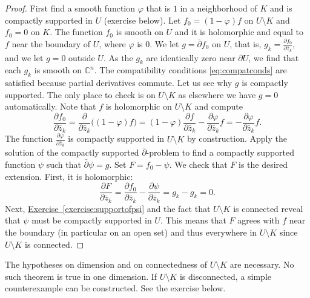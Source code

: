 \documentclass[12pt,openany]{book}
\newcommand{\C}{{\mathbb{C}}}
\theoremstyle{plain}
\theoremstyle{remark}
\theoremstyle{definition}
\theoremstyle{exercise}
\theoremstyle{example}
\newcommand{\exerciseref}[1]{\hyperref[#1]{Exercise~\ref*{#1}}}
\begin{document}
\begin{proof}
First find a smooth function $\varphi$ that is $1$ in a neighborhood of
$K$ and is compactly supported in $U$ (exercise below).  Let
$f_0 = (1-\varphi)f$ on $U \setminus K$ and $f_0 = 0$ on $K$.  The function $f_0$
is smooth on $U$ and it is holomorphic
and equal to $f$ near the boundary of $U$, where $\varphi$ is $0$.
We let $g = \bar{\partial} f_0$ on $U$, that is, $g_k = \frac{\partial
f_0}{\partial \bar{z}_k}$,
and we let $g=0$ outside $U$.
As the $g_k$ are identically zero near $\partial U$, we find that each
$g_k$ is smooth on $\C^n$.
The compatibility conditions
\eqref{eq:compatconds} are satisfied
because partial derivatives commute.
Let us see why $g$ is compactly supported.  The
only place to check is on $U \setminus K$ as elsewhere we have $g = 0$
automatically.  Note that $f$ is holomorphic on $U \setminus K$ and compute
\begin{equation*}
\frac{\partial f_0}{\partial \bar{z}_k}
=
\frac{\partial }{\partial \bar{z}_k}
\bigl((1-\varphi)f\bigr)
=
(1-\varphi)
\frac{\partial f}{\partial \bar{z}_k}
- \frac{\partial \varphi}{\partial \bar{z}_k} f
=
- \frac{\partial \varphi}{\partial \bar{z}_k} f .
\end{equation*}
The function $\frac{\partial \varphi}{\partial \bar{z}_k}$ is compactly supported in
$U \setminus K$ by construction.
Apply the solution of the compactly supported $\bar{\partial}$-problem
to find a
compactly supported function $\psi$ such that $\bar{\partial}\psi = g$.
Set $F = f_0 - \psi$.  We check that $F$ is the desired
extension.  First, it is holomorphic:
\begin{equation*}
\frac{\partial F}{\partial \bar{z}_k}
=
\frac{\partial f_0}{\partial \bar{z}_k}
-
\frac{\partial \psi}{\partial \bar{z}_k}
=
g_k
-
g_k
= 0 .
\end{equation*}
Next, \exerciseref{exercise:supportofpsi} and the fact that $U \setminus
K$ is connected reveal that $\psi$ must be compactly supported in $U$.
This means that $F$ agrees with $f$ near the boundary (in particular
on an open set) and thus everywhere in $U \setminus K$ since $U \setminus K$
is connected.
\end{proof}

The hypotheses on dimension and on connectedness of $U \setminus K$
are necessary.
No such theorem is true in one dimension.
If $U \setminus K$ is disconnected, a simple
counterexample can be constructed.
See the exercise below.
\end{document}
